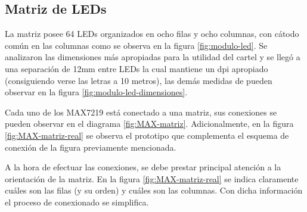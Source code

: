 \subsection{Matriz de LEDs}
La matriz posee 64 LEDs organizados en ocho filas y ocho columnas, con cátodo común en las columnas como se observa en la figura \ref{fig:modulo-led}. Se analizaron las dimensiones más apropiadas para la utilidad del cartel y se llegó a una separación de 12mm entre LEDs la cual mantiene un dpi apropiado (consiguiendo verse las letras a 10 metros), las demás medidas de pueden observar en la figura \ref{fig:modulo-led-dimensiones}.

Cada uno de los MAX7219 está conectado a una matriz, sus conexiones se pueden observar en el diagrama \ref{fig:MAX-matriz}. Adicionalmente, en la figura \ref{fig:MAX-matriz-real} se observa el prototipo que complementa el esquema de conexión de la figura previamente mencionada.

A la hora de efectuar las conexiones, se debe prestar principal atención a la orientación de la matriz. En la figura \ref{fig:MAX-matriz-real} se indica claramente cuáles son las filas (y su orden) y cuáles son las columnas. Con dicha información el proceso de conexionado se simplifica.

